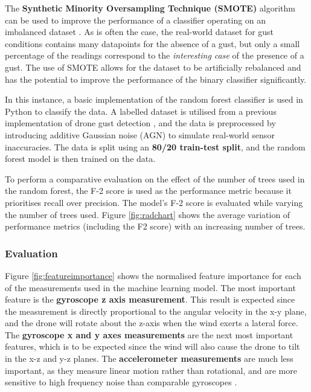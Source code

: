 The  \textbf{Synthetic Minority Oversampling Technique (SMOTE)} algorithm can be used to improve the performance of a classifier operating on an imbalanced dataset \cite{chawla2002smote}. As is often the case, the real-world dataset for gust conditions contains many datapoints for the absence of a gust, but only a small percentage of the readings correspond to the \textit{interesting case} of the presence of a gust. The use of SMOTE allows for the dataset to be artificially rebalanced and has the potential to improve the performance of the binary classifier significantly.

In this instance, a basic implementation of the random forest classifier \cite{scikit-learn} is used in Python to classify the data. A labelled dataset is utilised from a previous implementation of drone gust detection \cite{gu2018wind}, and the data is preprocessed by introducing additive Gaussian noise (AGN) to simulate real-world sensor inaccuracies. The data is split using an \textbf{80/20 train-test split}, and the random forest model is then trained on the data. 

To perform a comparative evaluation on the effect of the number of trees used in the random forest, the F-2 score is used as the performance metric because it prioritises recall over precision. The model's F-2 score is evaluated while varying the number of trees used. Figure \ref{fig:radchart} shows the average variation of performance metrics (including the F2 score) with an increasing number of trees. 

\subsubsection{Evaluation}

Figure \ref{fig:featureimportance} shows the normalised feature importance for each of the measurements used in the machine learning model. The most important feature is the \textbf{gyroscope z axis measurement}. This result is expected since the measurement is directly proportional to the angular velocity in the x-y plane, and the drone will rotate about the z-axis when the wind exerts a lateral force. The \textbf{gyroscope x and y axes measurements} are the next most important features, which is to be expected since the wind will also cause the drone to tilt in the x-z and y-z planes. The \textbf{accelerometer measurements} are much less important, as they measure linear motion rather than rotational, and are more sensitive to high frequency noise than comparable gyroscopes \cite{CASSON2016175}. 

